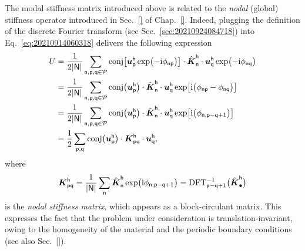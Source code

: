The modal stiffness matrix introduced above is related to the \emph{nodal}
(global) stiffness operator introduced in Sec.~\ref{} of Chap.~\ref{}. Indeed,
plugging the definition of the discrete Fourier transform (see
Sec.~\ref{sec:20210924084718}) into Eq. \eqref{eq:20210914060318} delivers the
following expression
\begin{equation}
  \begin{aligned}[b]
    U={}&\frac1{2\lvert\mathsf{N}\rvert}\sum_{\mathsf{n}, \mathsf{p}, \mathsf{q}\in\mathcal{P}}
    \operatorname{conj}\bigl[\boldsymbol u_\mathsf{p}^\mathsf{h}\exp\bigl(-\mathrm i\phi_\mathsf{np}\bigr)\bigr]
    \cdot\hat{\boldsymbol K}_\mathsf{n}^\mathsf{h}
    \cdot\boldsymbol u_\mathsf{q}^\mathsf{h}\exp\bigl(-\mathrm i\phi_\mathsf{nq}\bigr)\\
    ={}&\frac1{2\lvert\mathsf{N}\rvert}\sum_{\mathsf{n}, \mathsf{p}, \mathsf{q}\in\mathcal{P}}
    \operatorname{conj}\bigl(\boldsymbol u_\mathsf{p}^\mathsf{h}\bigr)
    \cdot\hat{\boldsymbol K}_\mathsf{n}^\mathsf{h}
    \cdot\boldsymbol u_\mathsf{q}^\mathsf{h}
    \exp\bigl[\mathrm i\bigl(\phi_\mathsf{np}-\phi_\mathsf{nq}\bigr)\bigr]\\
    ={}&\frac1{2\lvert\mathsf{N}\rvert}\sum_{\mathsf{n}, \mathsf{p}, \mathsf{q}\in\mathcal{P}}
    \operatorname{conj}\bigl(\boldsymbol u_\mathsf{p}^\mathsf{h}\bigr)
    \cdot\hat{\boldsymbol K}_\mathsf{n}^\mathsf{h}
    \cdot\boldsymbol u_\mathsf{q}^\mathsf{h}
    \exp\bigl[\mathrm i\bigl(\phi_{\mathsf{n}, \mathsf{p}-\mathsf{q}+1}\bigr)\bigr]\\
    ={}&\frac12\sum_{\mathsf{p},\mathsf{q}}
    \operatorname{conj}\bigl(\boldsymbol u_\mathsf{p}^\mathsf{h}\bigr)\cdot\boldsymbol K_\mathsf{pq}^\mathsf{h}
    \cdot\boldsymbol u_\mathsf{q}^\mathsf{h},
  \end{aligned}
\end{equation}
where
\begin{equation}
  \boldsymbol{K}_{\mathsf{pq}}^\mathsf{h}
  =\frac1{\lvert\mathsf{N}\rvert}\sum_{\mathsf{n}}
  \hat{\boldsymbol K}_\mathsf{n}^\mathsf{h}
  \exp\bigl(\mathrm i\phi_{\mathsf{n},\mathsf{p}-\mathsf{q}+1}\bigr)
  =\operatorname{DFT}_{\mathsf{p}-\mathsf{q}+1}^{-1}\bigl(\hat{\boldsymbol K}_\mathsf{\bullet}^\mathsf{h}\bigr)
\end{equation}
is the \emph{nodal stiffness matrix}, which appears as a block-circulant
matrix. This expresses the fact that the problem under consideration is
translation-invariant, owing to the homogeneity of the material and the periodic
boundary conditions (see also Sec.~\ref{}).

